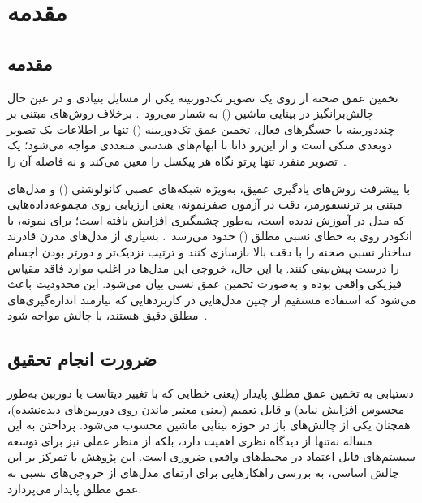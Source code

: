 \chapter{مقدمه}
\thispagestyle{fancy}\clearpage
\section{مقدمه}
تخمین عمق صحنه از روی یک تصویر تک‌دوربینه یکی از مسایل بنیادی و در عین حال چالش‌برانگیز در بینایی ماشین () به شمار می‌رود~\cite{Saxena2009Make3D,Eigen2014Depth}.
برخلاف روش‌های مبتنی بر چند‌دوربینه یا حسگرهای فعال،
تخمین عمق تک‌دوربینه () تنها بر اطلاعات یک تصویر دوبعدی متکی است و از این‌رو ذاتا با ابهام‌های هندسی متعددی مواجه می‌شود؛ یک تصویر منفرد تنها پرتو نگاه هر پیکسل را معین می‌کند و نه فاصله آن را~\cite{HartleyZisserman2004,Eigen2014Depth}.

با پیشرفت روش‌های یادگیری عمیق، به‌ویژه شبکه‌های عصبی کانولوشنی () و مدل‌های مبتنی بر ترنسفورمر،
دقت  در آزمون صفرنمونه، یعنی ارزیابی روی مجموعه‌داده‌هایی که مدل در آموزش ندیده است، به‌طور چشمگیری افزایش یافته است؛ برای نمونه،  با انکودر  روی  به خطای نسبی مطلق () حدود  می‌رسد~\cite{DepthAnythingV2}.
بسیاری از مدل‌های مدرن قادرند ساختار نسبی صحنه را با دقت بالا بازسازی کنند و ترتیب نزدیک‌تر و دورتر بودن اجسام را درست پیش‌بینی کنند. با این حال، خروجی این مدل‌ها در اغلب موارد فاقد مقیاس فیزیکی واقعی بوده و به‌صورت تخمین عمق نسبی بیان می‌شود. این محدودیت باعث می‌شود که استفاده مستقیم از چنین مدل‌هایی در کاربردهایی که نیازمند اندازه‌گیری‌های مطلق دقیق هستند، با چالش مواجه شود~\cite{Eigen2015Predicting,Ranftl2021DPT}.

\section{ضرورت انجام تحقیق}
دستیابی به تخمین عمق مطلق پایدار (یعنی خطایی که با تغییر دیتاست یا دوربین به‌طور محسوس افزایش نیابد) و قابل تعمیم (یعنی معتبر ماندن روی دوربین‌های دیده‌نشده)، همچنان یکی از چالش‌های باز در حوزه بینایی ماشین محسوب می‌شود. پرداختن به این مساله نه‌تنها از دیدگاه نظری اهمیت دارد، بلکه از منظر عملی نیز برای توسعه سیستم‌های قابل اعتماد در محیط‌های واقعی ضروری است. این پژوهش با تمرکز بر این چالش اساسی، به بررسی راهکارهایی برای ارتقای مدل‌های  از خروجی‌های نسبی به عمق مطلق پایدار می‌پردازد.


